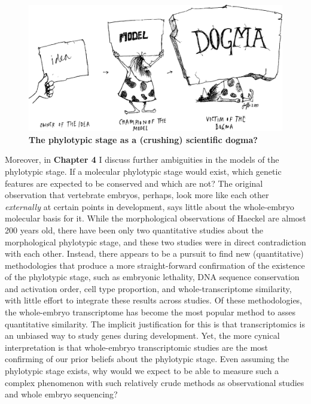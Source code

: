 \begin{figure}
    \includegraphics[width=\linewidth]{ch.discussion/imgs/dogma.png}
    \caption{\textbf{The phylotypic stage as a (crushing) scientific dogma?} \cite{Caveman2000}}
    \label{fig:dogma}
\end{figure}

Moreover, in \textbf{Chapter 4} I discuss further ambiguities in the models of the phylotypic stage. If a molecular phylotypic stage would exist, which genetic features are expected to be conserved and which are not? The original observation that vertebrate embryos, perhaps, look more like each other \textit{externally} at certain points in development, says little about the whole-embryo molecular basis for it. While the morphological observations of Haeckel are almost 200 years old, there have been only two quantitative studies about the morphological phylotypic stage, and these two studies were in direct contradiction with each other. Instead, there appears to be a pursuit to find new (quantitative) methodologies that produce a more straight-forward confirmation of the existence of the phylotypic stage, such as embryonic lethality\cite{Uchida2018},  DNA sequence conservation\cite{Piasecka2013,Quint2012,Liu2021} and activation order\cite{Uesaka2019}, cell type proportion\cite{Mayshar2023}, and whole-transcriptome similarity\cite{Piasecka2013,Irie2011,marletaz2018,Liu2020,Leong2021,PerezPosada2022,Kalinka2010}, with little effort to integrate these results across studies. Of these methodologies, the whole-embryo transcriptome has become the most popular method to asses quantitative similarity. The implicit justification for this is that transcriptomics is an unbiased way to study genes during development. Yet, the more cynical interpretation is that whole-embryo transcriptomic studies are the most confirming of our prior beliefs about the phylotypic stage. Even assuming the phylotypic stage exists, why would we expect to be able to measure such a complex phenomenon with such relatively crude methods as observational studies and whole embryo sequencing? 

